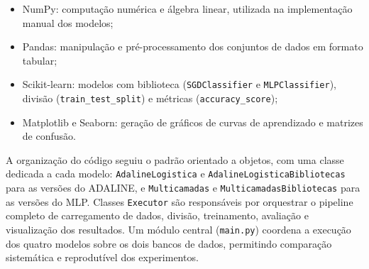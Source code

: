 \begin{itemize}
    \item NumPy: computação numérica e álgebra linear, utilizada na implementação manual dos modelos;
    \item Pandas: manipulação e pré-processamento dos conjuntos de dados em formato tabular;
    \item Scikit-learn: modelos com biblioteca (\texttt{SGDClassifier} e \texttt{MLPClassifier}), divisão (\texttt{train\_test\_split}) e métricas (\texttt{accuracy\_score});
    \item Matplotlib e Seaborn: geração de gráficos de curvas de aprendizado e matrizes de confusão.
\end{itemize}

{\sloppy
A organização do código seguiu o padrão orientado a objetos, com uma classe dedicada a cada modelo: \texttt{AdalineLogistica} e \texttt{AdalineLogisticaBibliotecas} para as versões do ADALINE, e \texttt{Multicamadas} e \texttt{MulticamadasBibliotecas} para as versões do MLP. Classes \texttt{Executor} são responsáveis por orquestrar o pipeline completo de carregamento de dados, divisão, treinamento, avaliação e visualização dos resultados. Um módulo central (\texttt{main.py}) coordena a execução dos quatro modelos sobre os dois bancos de dados, permitindo comparação sistemática e reprodutível dos experimentos.
\par}
